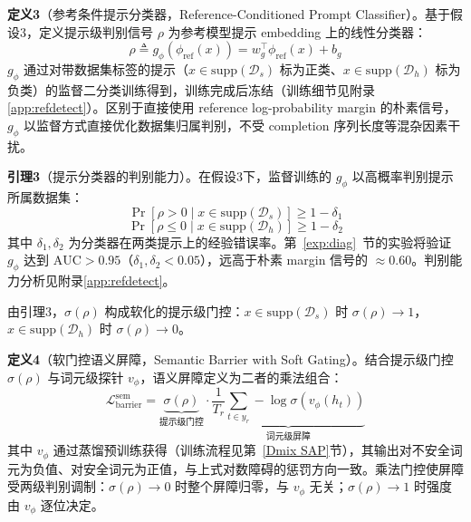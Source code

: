 \documentclass[lettersize,journal]{IEEEtran}
\begin{document}
\textbf{定义3}（参考条件提示分类器，Reference-Conditioned Prompt Classifier）。基于假设3，定义提示级判别信号 $\rho$ 为参考模型提示 embedding 上的线性分类器：
\begin{equation}\label{eq:prompt-classifier}
\rho \triangleq g_\phi(\phi_{\text{ref}}(x)) = w_g^\top \phi_{\text{ref}}(x) + b_g
\end{equation}
$g_\phi$ 通过对带数据集标签的提示（$x \in \mathrm{supp}(\mathcal{D}_s)$ 标为正类、$x \in \mathrm{supp}(\mathcal{D}_h)$ 标为负类）的监督二分类训练得到，训练完成后冻结（训练细节见附录\ref{app:refdetect}）。区别于直接使用 reference log-probability margin 的朴素信号，$g_\phi$ 以监督方式直接优化数据集归属判别，不受 completion 序列长度等混杂因素干扰。

\textbf{引理3}（提示分类器的判别能力）。在假设3下，监督训练的 $g_\phi$ 以高概率判别提示所属数据集：
\begin{equation}\label{eq:refdetect-s}
\Pr\left[\rho > 0 \mid x \in \mathrm{supp}(\mathcal{D}_s)\right] \geq 1 - \delta_1
\end{equation}
\begin{equation}\label{eq:refdetect-h}
\Pr\left[\rho \leq 0 \mid x \in \mathrm{supp}(\mathcal{D}_h)\right] \geq 1 - \delta_2
\end{equation}
其中 $\delta_1, \delta_2$ 为分类器在两类提示上的经验错误率。第~\ref{exp:diag}~节的实验将验证 $g_\phi$ 达到 $\text{AUC} > 0.95$（$\delta_1, \delta_2 < 0.05$），远高于朴素 margin 信号的 $\approx 0.60$。判别能力分析见附录\ref{app:refdetect}。

由引理3，$\sigma(\rho)$ 构成软化的提示级门控：$x \in \mathrm{supp}(\mathcal{D}_s)$ 时 $\sigma(\rho) \to 1$，$x \in \mathrm{supp}(\mathcal{D}_h)$ 时 $\sigma(\rho) \to 0$。

\textbf{定义4}（软门控语义屏障，Semantic Barrier with Soft Gating）。结合提示级门控 $\sigma(\rho)$ 与词元级探针 $v_\phi$，语义屏障定义为二者的乘法组合：
\begin{equation}\label{eq:semantic-barrier}
\mathcal{L}^{\text{sem}}_{\text{barrier}} = \underbrace{\sigma(\rho)}_{\text{提示级门控}} \cdot \underbrace{\frac{1}{T_r}\sum_{t \in y_r} -\log\sigma\!\left(v_\phi(h_t)\right)}_{\text{词元级屏障}}
\end{equation}
其中 $v_\phi$ 通过蒸馏预训练获得（训练流程见第~\ref{Dmix SAP}节），其输出对不安全词元为负值、对安全词元为正值，与上式对数障碍的惩罚方向一致。乘法门控使屏障受两级判别调制：$\sigma(\rho) \to 0$ 时整个屏障归零，与 $v_\phi$ 无关；$\sigma(\rho) \to 1$ 时强度由 $v_\phi$ 逐位决定。
\end{document}
